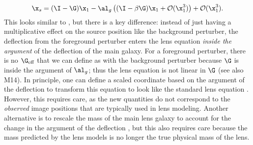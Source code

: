 \begin{equation}
\x_s = (\I - \G) \x_1 - \al_g\left((\I - \beta\G) \x_1 + \mathcal{O}(\x_1^3)\right) + \mathcal{O}(\x_1^3).
\end{equation}
This looks similar to , but there is a key difference: instead of just having a multiplicative effect on the source position like the background perturber, the deflection from the foreground perturber enters the lens equation \textit{inside the argument} of the deflection of the main galaxy. For a foreground perturber, there is no $\G_{\rm eff}$ that we can define as with the background perturber because $\G$ is inside the argument of $\al_g$; thus the lens equation is not linear in $\G$ (see also M14). In principle, one can define a scaled coordinate based on the argument of the deflection to transform this equation to look like the standard lens equation \citep[e.g.,][]{Schneider97,Keeton03}. However, this requires care, as the new quantities do not correspond to the \textit{observed} image positions that are typically used in lens modeling. Another alternative is to rescale the mass of the main lens galaxy to account for the change in the argument of the deflection \citep{Schneider97}, but this also requires care because the mass predicted by the lens models is no longer the true physical mass of the lens.